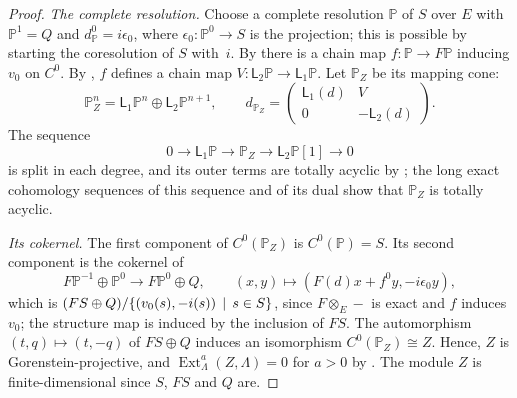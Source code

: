 \begin{proof}
  \emph{The complete resolution.} Choose a complete resolution $\mathbb{P}$ of
  $S$ over $E$ with ${\mathbb{P}^1=Q}$ and ${d^0_{\mathbb{P}}=i\epsilon_0}$, where
  ${\epsilon_0\colon\mathbb{P}^0\to S}$ is the projection; this is possible by
  starting the coresolution of $S$ with~$i$. By
   there is a chain map ${f\colon\mathbb{P}\to
  F\mathbb{P}}$ inducing $v_0$ on $C^0$. By , $f$ defines
  a chain map ${V\colon\mathsf{L}_2\mathbb{P}\to\mathsf{L}_1\mathbb{P}}$. Let
  $\mathbb{P}_Z$ be its mapping cone:
  \[
    \mathbb{P}_Z^n=\mathsf{L}_1\mathbb{P}^n\oplus\mathsf{L}_2\mathbb{P}^{n+1},
    \qquad d_{\mathbb{P}_Z}=\begin{pmatrix}\mathsf{L}_1(d)&V\\0&
    -\mathsf{L}_2(d)\end{pmatrix}.
  \]
  The sequence
  \[
    0\longrightarrow\mathsf{L}_1\mathbb{P}\longrightarrow\mathbb{P}_Z
    \longrightarrow\mathsf{L}_2\mathbb{P}[1]\longrightarrow0
  \]
  is split in each degree, and its outer terms
  are totally acyclic by ; the long exact cohomology
  sequences of this sequence and of its dual show that $\mathbb{P}_Z$ is
  totally acyclic.

  \emph{Its cokernel.} The first component of $C^0(\mathbb{P}_Z)$ is
  ${C^0(\mathbb{P})=S}$. Its second component is the cokernel of
  \[
    F\mathbb{P}^{-1}\oplus\mathbb{P}^0\longrightarrow F\mathbb{P}^0\oplus Q,
    \qquad(x,y)\longmapsto(F(d)x+f^0y,-i\epsilon_0y),
  \]
  which is ${(FS\oplus Q)/\set{(v_0(s),-i(s))}[s\in S]}$, since ${F\otimes_E-}$ is
  exact and $f$ induces $v_0$; the structure map is induced by the inclusion of
  $FS$. The automorphism ${(t,q)\mapsto(t,-q)}$ of ${FS\oplus Q}$ induces an
  isomorphism ${C^0(\mathbb{P}_Z)\cong Z}$. Hence, $Z$ is Gorenstein-projective,
  and ${\operatorname{Ext}^a_\Lambda(Z,\Lambda)=0}$ for ${a>0}$ by
  . The module $Z$ is finite-dimensional
  since $S$, $FS$ and $Q$ are.


\end{proof}
